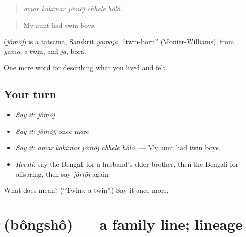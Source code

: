 \begin{quote}
    
\end{quote}

\begin{quote}
\emph{āmār kākimār jômôj chhele hôlô.}
\end{quote}

\begin{quote}
My aunt had twin boys.
\end{quote}

\begin{cousinweb}
\textbf{} (\emph{jômôj}) is a tatsama, Sanskrit \emph{yamaja}, \textquotedblleft{}twin-born\textquotedblright{} (Monier-Williams), from \emph{yama}, a twin, and \emph{ja}, born.
\end{cousinweb}

\begin{grammarlens}[title={What you've built}]
One more word for describing what you lived and felt.
\end{grammarlens}

\subsection*{Your turn}
\begin{itemize}
\raggedright
  \item \emph{Say it:} \emph{jômôj}
  \item \emph{Say it:} \emph{jômôj}, once more
  \item \emph{Say it:} \emph{āmār kākimār jômôj chhele hôlô.} — My aunt had twin boys.
  \item \emph{Recall:} say the Bengali for a husband's elder brother, then the Bengali for offspring, then say \emph{jômôj} again
\end{itemize}

\begin{tcolorbox}[breakable,colback=teal!4,colframe=teal!35!black,title={Before you move on}]
What does  mean? (\textquotedblleft{}Twins; a twin\textquotedblright{}.) Say it once more.
\end{tcolorbox}
\section[\texorpdfstring{\bn{বংশ} (bôngshô)}{বংশ (bôngshô)}]{ (bôngshô) — a family line; lineage}

\label{lesson:BN-C484-bongsho}



